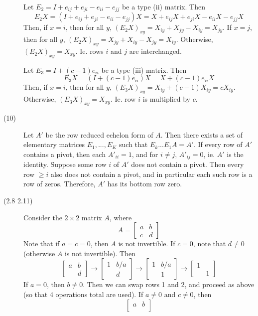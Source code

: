 \begin{description}
Let $E_2 = I + e_{ij} + e_{ji} - e_{ii} - e_{jj}$ be a type (ii) matrix. Then
$$E_2X = (I + e_{ij} + e_{ji} - e_{ii} - e_{jj})X = X + e_{ij}X + e_{ji}X - e_{ii}X - e_{jj}X$$
Then, if $x = i$, then for all $y$, $(E_2X)_{xy} = X_{iy} + X_{jy} - X_{iy} = X_{jy}$. If $x = j$, then for all $y$, $(E_2X)_{xy} = X_{jy} + X_{iy} - X_{jy} = X_{iy}$. Otherwise, $(E_2X)_{xy} = X_{xy}$. Ie. rows $i$ and $j$ are interchanged.

Let $E_3 = I + (c - 1)e_{ii}$ be a type (iii) matrix. Then
$$E_3X = (I + (c - 1)e_{ii})X = X + (c-1)e_{ii}X$$
Then, if $x = i$, then for all $y$, $(E_3X)_{xy} = X_{iy} + (c-1)X_{iy} = cX_{iy}$. Otherwise, $(E_3X)_{xy} = X_{xy}$. Ie. row $i$ is multiplied by $c$.
\item[(10)]
Let $A'$ be the row reduced echelon form of $A$. Then there exists a set of elementary matrices $E_1, ..., E_K$ such that $E_k...E_1A = A'$. If every row of $A'$ contains a pivot, then each $A'_{ii} = 1$, and  for $ i \neq j$, $A'_{ij} = 0$, ie. $A'$ is the identity. Suppose some row $i$ of $A'$ does not contain a pivot. Then every row $\geq i$ also does not contain a pivot, and in particular each such row is a row of zeros. Therefore, $A'$ has its bottom row zero.
\item[(2.8 {\color{cBlue}2.11})]
Consider the $2 \times 2$ matrix $A$, where
$$A = \begin{bmatrix}
a & b \\
c & d
\end{bmatrix}$$
Note that if $a = c = 0$, then $A$ is not invertible. If $c = 0$, note that $d \neq 0$ (otherwise $A$ is not invertible). Then
$$\begin{bmatrix}
a & b \\
& d
\end{bmatrix} \rightarrow \begin{bmatrix}
1 & b/a \\
& d
\end{bmatrix} \rightarrow \begin{bmatrix}
1 & b/a \\
& 1
\end{bmatrix} \rightarrow \begin{bmatrix}
1 & \\
& 1
\end{bmatrix}$$
If $a = 0$, then $b \neq 0$. Then we can swap rows 1 and 2, and proceed as above (so that 4 operations total are used). If $a \neq 0$ and $c \neq 0$, then
$$\begin{bmatrix}
a & b \\

\end{bmatrix}$$
\end{description}

